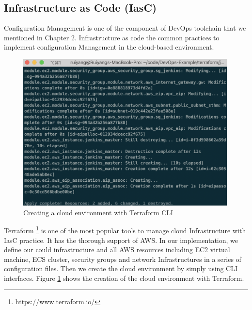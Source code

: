 \subsection{Infrastructure as Code (IasC)}
Configuration Management is one of the component of DevOps toolchain that we mentioned in Chapter 2. Infrastructure as code the common practices to implement configuration Management in the cloud-based environment.
\begin{figure}[h]
    \centering
    \includegraphics[width=0.99\textwidth]{pics/terraform.png}
    \caption{Creating a cloud environment with Terraform CLI}
    \label{fig:terraform}
\end{figure}
\par
Terraform \footnote{https://www.terraform.io/} is one of the most popular tools to manage cloud Infrastructure with IasC practice. It has the thorough support of AWS. In our implementation, we define our could infrastructure and all AWS resources including EC2 virtual machine, ECS cluster, security groups and network Infrastructures in a series of configuration files. Then we create the cloud environment by simply using CLI interfaces. Figure \ref{fig:terraform} shows the creation of the cloud environment with Terraform.
